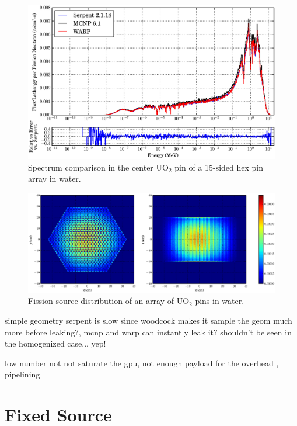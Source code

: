 \begin{figure}[h!] 
\centering
\includegraphics[width=\textwidth]{graphics/finalresults/assembly_spec-6.eps}
\caption{Spectrum comparison in the center UO$_2$ pin of a 15-sided hex pin array in water. \label{assembly_spec} }
\end{figure}

\begin{figure}[h!]
\centering
\includegraphics[width=\textwidth,trim= 2cm 0cm 2cm 0cm]{graphics/finalresults/assembly_fiss-6.eps}
\caption{Fission source distribution of an array of UO$_2$ pins in water. \label{assembly_fiss} }
\end{figure}

simple geometry serpent is slow since woodcock makes it sample the geom much more before leaking?, mcnp and warp can instantly leak it?  shouldn't be seen in the homogenized case... yep!

low number not not saturate the gpu, not enough payload for the overhead , pipelining

\section{Fixed Source}

